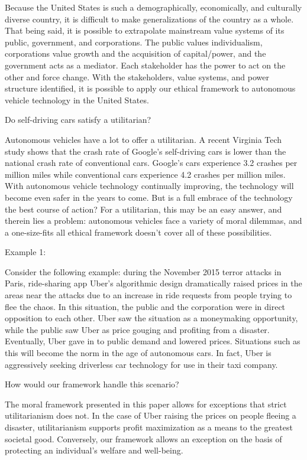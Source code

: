 Because the United States is such a demographically, economically, and 
culturally diverse country, it is difficult to make generalizations of 
the country as a whole. That being said, it is possible to extrapolate 
mainstream value systems of its public, government, and corporations. 
The public values individualism, corporations value growth and the 
acquisition of capital/power, and the government acts as a mediator. 
Each stakeholder has the power to act on the other and force change. 
With the stakeholders, value systems, and power structure identified, 
it is possible to apply our ethical framework to autonomous vehicle 
technology in the United States.

{\large Do self-driving cars satisfy a utilitarian?}

Autonomous vehicles have a lot to offer a utilitarian. A recent 
Virginia Tech study\cite{blanco2016automated} shows that the crash 
rate of Google's self-driving cars is lower than the national crash rate 
of conventional cars. Google's cars experience 3.2 crashes per million 
miles while conventional cars experience 4.2 crashes per million miles. 
With autonomous vehicle technology continually improving, the technology 
will become even safer in the years to come. But is a full embrace of 
the technology the best course of action? For a utilitarian, this may 
be an easy answer, and therein lies a problem: autonomous vehicles face 
a variety of moral dilemmas, and a one-size-fits all ethical framework 
doesn't cover all of these possibilities.

{\large Example 1:}

Consider the following example: during the November 2015 terror attacks 
in Paris, ride-sharing app Uber's algorithmic design dramatically raised 
prices in the areas near the attacks due to an increase in ride requests 
from people trying to flee the chaos. In this situation, the public and 
the corporation were in direct opposition to each other. Uber saw the 
situation as a moneymaking opportunity, while the public saw Uber as 
price gouging and profiting from a disaster. Eventually, Uber gave in 
to public demand and lowered prices. Situations such as this will become 
the norm in the age of autonomous cars. In fact, Uber is aggressively 
seeking driverless car technology for use in their taxi company.

{\large How would our framework handle this scenario?}

The moral framework presented in this paper allows for exceptions that 
strict utilitarianism does not. In the case of Uber raising the prices 
on people fleeing a disaster, utilitarianism supports profit 
maximization as a means to the greatest societal good. Conversely, our 
framework allows an exception on the basis of protecting an 
individual's welfare and well-being.

